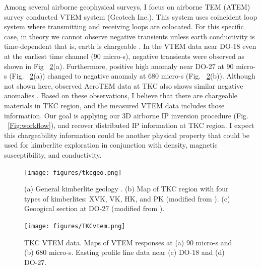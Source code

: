 \documentclass[letterpaper,11pt]{article}
\begin{document}
Among several airborne geophysical surveys, I focus on airborne TEM (ATEM) survey conducted VTEM system (Geotech Inc.). This system uses coincident loop system where transmitting and receiving loops are colocated. For this specific case, in theory we cannot observe negative transients unless earth conductivity is time-dependent that is, earth is chargeable \cite[]{Weidelt1982}. In the VTEM data near DO-18 even at the earliest time channel (90 micro-s), negative transients were observed as shown in Fig ~\ref{Fig:TKCvtem}(a). Furthermore, positive high anomaly near DO-27 at 90 micro-s (Fig. ~\ref{Fig:TKCvtem}(a)) changed to negative anomaly at 680 micro-s (Fig. ~\ref{Fig:TKCvtem}(b)). Although not shown here, observed AeroTEM data at TKC also shows similar negative anomalies \cite[]{JansenEtAl2004}. Based on these observations, I believe that there are chargeable materials in TKC region, and the measured VTEM data includes those information. Our goal is applying our 3D airborne IP inversion procedure (Fig. ~\ref{Fig:workflow}), and recover distributed IP information at TKC region. I expect this chargeability information could be another physical property that could be used for kimberlite exploration in conjunction with density, magnetic susceptibility, and conductivity. 

\begin{figure}[htb]
  \centering
  \texttt{[image: figures/tkcgeo.png]}
  \caption{(a) General kimberlite geology \cite[]{PowerHildes2007}. (b) Map of TKC region with four types of kimberlites: XVK, VK, HK, and PK (modified from \cite{JansenEtAl2004}). (c) Geoogical section at DO-27 (modified from \cite{HarderEtAl2006}). }
  \label{Fig:tkcgeo}
\end{figure}

\begin{figure}[htb]
  \centering
  \texttt{[image: figures/TKCvtem.png]}
  \caption{TKC VTEM data. Maps of VTEM responses at (a) 90 micro-s and (b) 680 micro-s. Easting profile line data near (c) DO-18 and (d) DO-27. }
  \label{Fig:TKCvtem}
\end{figure}
\clearpage

\end{document}
